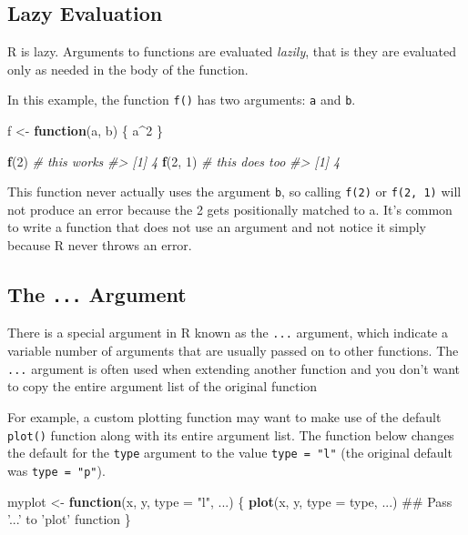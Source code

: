 \documentclass[]{book}
\newenvironment{Shaded}{\begin{snugshade}}{\end{snugshade}}
\newcommand{\KeywordTok}[1]{\textcolor[rgb]{0.13,0.29,0.53}{\textbf{#1}}}
\newcommand{\DataTypeTok}[1]{\textcolor[rgb]{0.13,0.29,0.53}{#1}}
\newcommand{\DecValTok}[1]{\textcolor[rgb]{0.00,0.00,0.81}{#1}}
\newcommand{\StringTok}[1]{\textcolor[rgb]{0.31,0.60,0.02}{#1}}
\newcommand{\CommentTok}[1]{\textcolor[rgb]{0.56,0.35,0.01}{\textit{#1}}}
\newcommand{\ControlFlowTok}[1]{\textcolor[rgb]{0.13,0.29,0.53}{\textbf{#1}}}
\newcommand{\OperatorTok}[1]{\textcolor[rgb]{0.81,0.36,0.00}{\textbf{#1}}}
\newcommand{\NormalTok}[1]{#1}
\theoremstyle{definition}
\theoremstyle{definition}
\theoremstyle{definition}
\theoremstyle{remark}
\begin{document}
\subsection{Lazy Evaluation}\label{lazy-evaluation}

R is lazy. Arguments to functions are evaluated \emph{lazily}, that is
they are evaluated only as needed in the body of the function.

In this example, the function \texttt{f()} has two arguments: \texttt{a}
and \texttt{b}.

\begin{Shaded}
\begin{Highlighting}[]
\NormalTok{f <-}\StringTok{ }\ControlFlowTok{function}\NormalTok{(a, b) \{}
\NormalTok{  a}\OperatorTok{^}\DecValTok{2}
\NormalTok{\} }

\KeywordTok{f}\NormalTok{(}\DecValTok{2}\NormalTok{)     }\CommentTok{# this works}
\CommentTok{#> [1] 4}
\KeywordTok{f}\NormalTok{(}\DecValTok{2}\NormalTok{, }\DecValTok{1}\NormalTok{)  }\CommentTok{# this does too}
\CommentTok{#> [1] 4}
\end{Highlighting}
\end{Shaded}

This function never actually uses the argument \texttt{b}, so calling
\texttt{f(2)} or \texttt{f(2,\ 1)} will not produce an error because the
2 gets positionally matched to a. It's common to write a function that
does not use an argument and not notice it simply because R never throws
an error.

\subsection{\texorpdfstring{The \texttt{...}
Argument}{The ... Argument}}\label{the-...-argument}

There is a special argument in R known as the \texttt{...} argument,
which indicate a variable number of arguments that are usually passed on
to other functions. The \texttt{...} argument is often used when
extending another function and you don't want to copy the entire
argument list of the original function

For example, a custom plotting function may want to make use of the
default \texttt{plot()} function along with its entire argument list.
The function below changes the default for the \texttt{type} argument to
the value \texttt{type\ =\ "l"} (the original default was
\texttt{type\ =\ "p"}).

\begin{Shaded}
\begin{Highlighting}[]
\NormalTok{myplot <-}\StringTok{ }\ControlFlowTok{function}\NormalTok{(x, y, }\DataTypeTok{type =} \StringTok{"l"}\NormalTok{, ...) \{}
        \KeywordTok{plot}\NormalTok{(x, y, }\DataTypeTok{type =}\NormalTok{ type, ...)         ## Pass '...' to 'plot' function}
\NormalTok{\}}
\end{Highlighting}
\end{Shaded}
\end{document}
